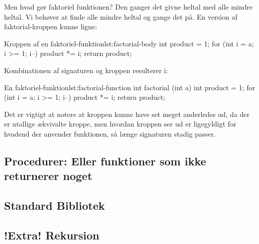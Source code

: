 		Men hvad gør faktoriel funktionen? Den ganger det givne heltal med alle mindre
		heltal. Vi behøver at finde alle mindre heltal og gange det på. En version
		af faktorial-kroppen kunne ligne:

		\begin{JavaCode}{Kroppen af en faktoriel-funktion}{lst:factorial-body}
			int product = 1;
			for (int i = a; i >= 1; i--)
				product *= i;
			return product;
		\end{JavaCode}

		Kombinationen af signaturen og kroppen resulterer i:

		\begin{JavaCode}{En faktoriel-funktion}{lst:factorial-function}
			int factorial (int a) {
				int product = 1;
				for (int i = a; i >= 1; i--)
					product *= i;
				return product;
			}
		\end{JavaCode}

		Det er vigtigt at notere at kroppen kunne have set meget anderledes ud, da
		der er utallige ækvivalte kroppe, men hvordan kroppen ser ud er ligegyldigt for
		hvadend der anvender funktionen, så længe signaturen stadig passer.



	\subsection{Procedurer: Eller funktioner som ikke returnerer noget}


	\subsection{Standard Bibliotek}


	\subsection{!Extra! Rekursion}

